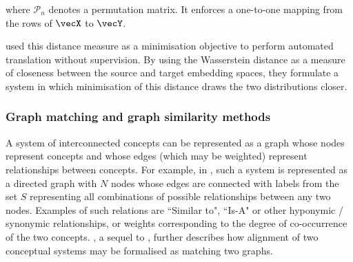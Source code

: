 where $\mathscr{P}_n$ denotes a permutation matrix. It enforces a one-to-one mapping from the rows of $\vecX$ to $\vecY$.


\cite{Zhang2017EarthMD} used this distance measure as a minimisation objective to perform automated translation without supervision. By using the Wasserstein distance as a measure of closeness between the source and target embedding spaces, they formulate a system in which minimisation of this distance draws the two distributions closer. %




\subsubsection{Graph matching and graph similarity methods}

A system of interconnected concepts can be represented as a graph whose nodes represent concepts and whose edges (which may be weighted) represent relationships between concepts. For example, in \cite{Absurdist2}, such a system is represented as a directed graph with $N$ nodes whose edges are connected with labels from the set $S$ representing all combinations of possible relationships between any two nodes. Examples of such relations are ``Similar to", ``Is-A" or other hyponymic / synonymic relationships, or weights corresponding to the degree of co-occurrence of the two concepts. \cite{Absurdist2}, a sequel to \cite{GOLDSTONE2002295}, further describes how alignment of two conceptual systems may be formalised as matching two graphs.

